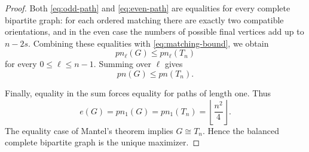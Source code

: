 \documentclass[10pt,a4paper]{amsart}
\newcommand{\pn}{pn}
\begin{document}
\begin{proof}
Both \eqref{eq:odd-path} and \eqref{eq:even-path} are equalities for
every complete bipartite graph: for each ordered matching there are
exactly two compatible orientations, and in the even case the numbers
of possible final vertices add up to $n-2s$. Combining these
equalities with \eqref{eq:matching-bound}, we obtain
\[
        \pn_\ell(G)\leq\pn_\ell(T_n)
\]
for every $0\leq\ell\leq n-1$. Summing over $\ell$ gives
\[
        \pn(G)\leq\pn(T_n).
\]

Finally, equality in the sum forces equality for paths of length one.
Thus
\[
        e(G)=\pn_1(G)=\pn_1(T_n)
             =\left\lfloor\frac{n^2}{4}\right\rfloor.
\]
The equality case of Mantel's theorem implies $G\cong T_n$. Hence the
balanced complete bipartite graph is the unique maximizer.
\end{proof}
\end{document}
